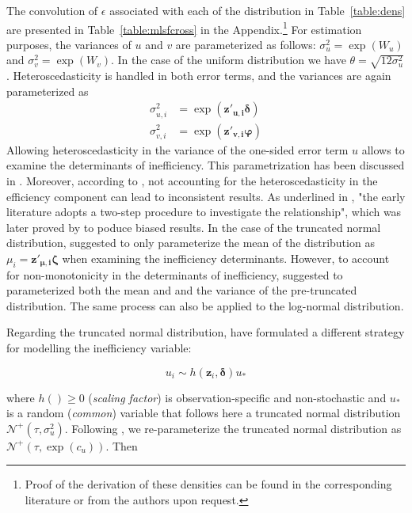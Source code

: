 \documentclass[nojss]{jss}
\begin{document}
The convolution of $\epsilon$ associated with each of the distribution in 
Table~\ref{table:dens} are presented in Table~\ref{table:mlsfcross} in the 
Appendix.\footnote{Proof of the derivation of these densities can be found in 
the corresponding literature or from the authors upon request.} For estimation 
purposes, the variances of $u$ and $v$ are parameterized as follows:
$\sigma_u^2 = \exp{\left(W_u\right)}$ and $\sigma_v^2 = \exp{\left(W_v\right)}$.
In the case of the uniform distribution we have $\theta = \sqrt{12\sigma_u^2}$.
Heteroscedasticity is handled in both error terms, and the variances are again 
parameterized as
%
\begin{align*}
\sigma_{u,i}^2 &=\exp\left(\mathbf{z'_{u,i}}\bm\delta\right) \\
\sigma_{v,i}^2 &=\exp\left( \mathbf{z'_{v, i}}\bm\varphi\right)
\end{align*}
%
Allowing heteroscedasticity in the variance of the one-sided error term $u$ 
allows to examine the determinants of inefficiency. This parametrization has 
been discussed in \citet{reif91, cau93, cau95, had99}. Moreover, according to 
\citet{wang02}, not accounting for the heteroscedasticity in the efficiency  
component can lead to inconsistent results. As underlined in 
\citet[p.~115]{kum14}, "the early literature adopts a two-step procedure to investigate 
the relationship", which was later proved by \citet{wang02} to poduce biased results.
In the case of the truncated normal distribution, \citet{kum91, hua94, batt95}
suggested to only parameterize the mean of the distribution as 
$\mu_i = \mathbf{z}'_{\bm\mu, \mathbf{i}}\bm\zeta$ when examining the 
inefficiency determinants. However, to account for non-monotonicity in the 
determinants of inefficiency, \citet{wang02b} suggested to parameterized both the 
mean and and the variance of the pre-truncated distribution. The same process
can also be applied to the log-normal distribution.

Regarding the truncated normal distribution, \citet{wang02} have formulated a 
different strategy for modelling the inefficiency variable:

$$u_i \sim h(\mathbf{z}_i, \bm\delta)u_*$$

where $h() \geq 0$ (\textit{scaling factor}) is observation-specific and 
non-stochastic and $u_*$ is a random (\textit{common}) variable that follows 
here a truncated normal distribution $\mathcal{N}^+\left(\tau, \sigma_u^2\right)$. 
Following \cite{kum14}, we re-parameterize the truncated normal distribution as 
$\mathcal{N}^+\left(\tau, \exp{\left(c_u\right)}\right)$. Then
\end{document}
